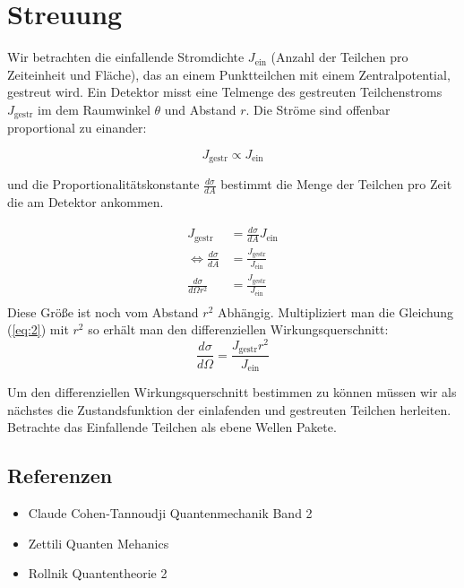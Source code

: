 


\usepackage{amsmath} 





\section*{Streuung}

Wir betrachten die einfallende Stromdichte \(J_{\text{ein}}\) (Anzahl der Teilchen pro Zeiteinheit und Fläche), das an einem Punktteilchen mit einem Zentralpotential, gestreut wird. Ein Detektor misst eine Telmenge des gestreuten Teilchenstroms \(J_{\text{gestr}}\) im dem Raumwinkel \(\theta\) und Abstand \(r\). Die Ströme sind offenbar proportional zu einander:


\begin{equation}
  \label{eq:1}
  J_{\text{gestr}} \propto J_{\text{ein}}
\end{equation}


und die Proportionalitätskonstante \(\frac{d\sigma}{dA}\) bestimmt die Menge der Teilchen pro Zeit die am Detektor ankommen. 

\begin{align}
  \label{eq:2}
  J_{\text{gestr}} &= \frac{d\sigma}{dA} J_{\text{ein}}\\
\Leftrightarrow \frac{d\sigma}{dA} &= \frac{ J_{\text{gestr}} }{J_{\text{ein}}} \\
\frac{d\sigma}{d\Omega r^2} &= \frac{ J_{\text{gestr}} }{J_{\text{ein}}} \\
\end{align}
Diese Größe ist noch vom Abstand \(r^2\) Abhängig. Multipliziert man die Gleichung (\ref{eq:2}) mit \(r^2\) so erhält man den differenziellen Wirkungsquerschnitt:
\begin{equation}
  \label{eq:3}
  \boxed{ \frac{d\sigma}{d\Omega} = \frac{ J_{\text{gestr}}r^2 }{J_{\text{ein}}} }
\end{equation}

Um den differenziellen Wirkungsquerschnitt bestimmen zu können müssen wir als nächstes die Zustandsfunktion der einlafenden und  gestreuten Teilchen herleiten. Betrachte das Einfallende Teilchen als ebene Wellen Pakete. 




\subsection*{Referenzen}
\begin{itemize}
\item Claude Cohen-Tannoudji Quantenmechanik Band 2
\item Zettili Quanten Mehanics
\item Rollnik Quantentheorie 2
\end{itemize}



